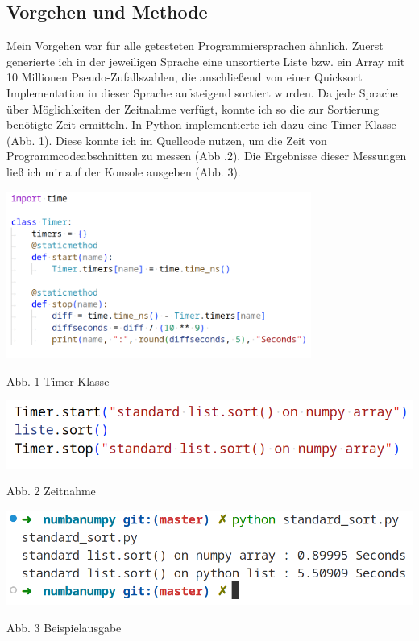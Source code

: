 \documentclass[11pt,a4paper]{article}
\begin{document}
\subsection{Vorgehen und Methode}

Mein Vorgehen war für alle getesteten Programmiersprachen ähnlich.
Zuerst generierte ich in der jeweiligen Sprache eine unsortierte Liste bzw. ein Array mit 10 Millionen Pseudo-Zufallszahlen,
die anschließend von einer Quicksort Implementation in dieser Sprache aufsteigend sortiert wurden.
Da jede Sprache über Möglichkeiten der Zeitnahme verfügt, konnte ich so die zur Sortierung benötigte Zeit
ermitteln. In Python implementierte ich dazu eine Timer-Klasse
(Abb. 1). Diese konnte ich im Quellcode nutzen, um die Zeit von Programmcodeabschnitten zu messen (Abb .2).
Die Ergebnisse dieser Messungen ließ ich mir auf der Konsole ausgeben (Abb. 3).

\begin{center}
    \includegraphics[width=0.75\textwidth]{screenshots/pythontimerlight.png}

    Abb. 1 Timer Klasse
\end{center}

\begin{center}
    \includegraphics[width=.75\textwidth]{screenshots/timerexamplelight.png}

    Abb. 2 Zeitnahme

    \includegraphics[width=.75\textwidth]{screenshots/outputexamplelight.png}

    Abb. 3 Beispielausgabe
\end{center}
\end{document}
